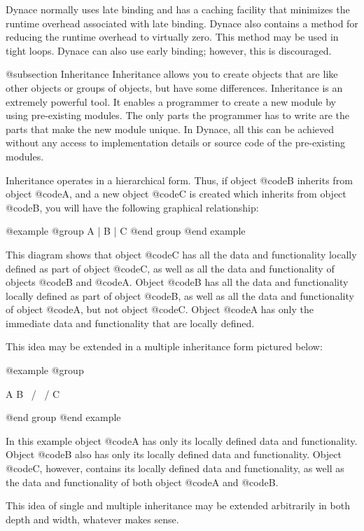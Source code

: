 Dynace normally uses late binding and has a caching facility that minimizes
the runtime overhead associated with late binding.  Dynace also contains
a method for reducing the runtime overhead to virtually zero.  This
method may be used in tight loops.  Dynace can also use early binding;
however, this is discouraged.

@subsection Inheritance
Inheritance allows you to create objects that are like other objects
or groups of objects, but have some differences.  Inheritance is an
extremely powerful tool.  It enables a programmer to create a new
module by using pre-existing modules.  The only parts the programmer has
to write are the parts that make the new module unique.  In Dynace, all
this can be achieved without any access to implementation details or
source code of the pre-existing modules.

Inheritance operates in a hierarchical form.  Thus, if object @code{B}
inherits from object @code{A}, and a new object @code{C} is created
which inherits from object @code{B}, you will have the following
graphical relationship:


@example
@group
                       A
                       |
                       B
                       |
                       C
@end group
@end example

This diagram shows that object @code{C} has all the data and
functionality locally defined as part of object @code{C}, as well as all
the data and functionality of objects @code{B} and @code{A}.  Object
@code{B} has all the data and functionality locally defined as part of
object @code{B}, as well as all the data and functionality of object
@code{A}, but not object @code{C}.  Object @code{A} has only the
immediate data and functionality that are locally defined.

This idea may be extended in a multiple inheritance form pictured below:

@example
@group

               A     B
                \   /
                 \ /
                  C

@end group
@end example

In this example object @code{A} has only its locally defined data and
functionality.  Object @code{B} also has only its locally defined
data and functionality.  Object @code{C}, however, contains its locally
defined data and functionality, as well as the data and functionality of both
object @code{A} and @code{B}.

This idea of single and multiple inheritance may be extended arbitrarily
in both depth and width, whatever makes sense.

